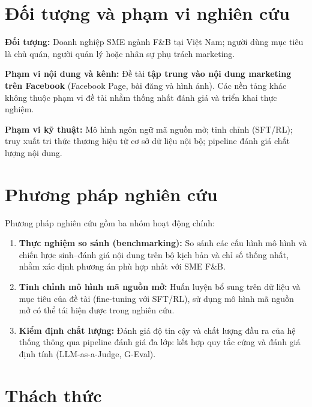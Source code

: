 \section{Đối tượng và phạm vi nghiên cứu}\label{sec:doi-tuong-pham-vi}

\textbf{Đối tượng:} Doanh nghiệp SME ngành F\&B tại Việt Nam; người dùng
mục tiêu là chủ quán, người quản lý hoặc nhân sự phụ trách marketing.

\textbf{Phạm vi nội dung và kênh:} Đề tài \textbf{tập trung vào nội dung
marketing trên Facebook} (Facebook Page, bài đăng và hình ảnh). Các nền tảng khác không thuộc phạm vi đề tài
nhằm thống nhất đánh giá và triển khai thực nghiệm.

\textbf{Phạm vi kỹ thuật:} Mô hình ngôn ngữ mã nguồn mở; tinh chỉnh
(SFT/RL); truy xuất tri thức thương hiệu từ cơ sở dữ liệu nội bộ; pipeline đánh giá chất lượng nội dung.

\section{Phương pháp nghiên cứu}\label{sec:phuong-phap}

Phương pháp nghiên cứu gồm ba nhóm hoạt động chính:

\begin{enumerate}
\item
  \textbf{Thực nghiệm so sánh (benchmarking):} So sánh các cấu hình mô
  hình và chiến lược sinh--đánh giá nội dung trên bộ kịch bản và chỉ số
  thống nhất, nhằm xác định phương án phù hợp nhất với SME F\&B.

\item
  \textbf{Tinh chỉnh mô hình mã nguồn mở:} Huấn luyện bổ sung trên dữ
  liệu và mục tiêu của đề tài (fine-tuning với SFT/RL), sử dụng mô
  hình mã nguồn mở có thể tái hiện được trong nghiên cứu.

\item
  \textbf{Kiểm định chất lượng:} Đánh giá độ tin cậy và chất lượng đầu
  ra của hệ thống thông qua pipeline đánh giá đa lớp: kết hợp quy tắc cứng và đánh giá định tính (LLM-as-a-Judge, G-Eval).
\end{enumerate}

\section{Thách thức}\label{sec:thach-thuc}

